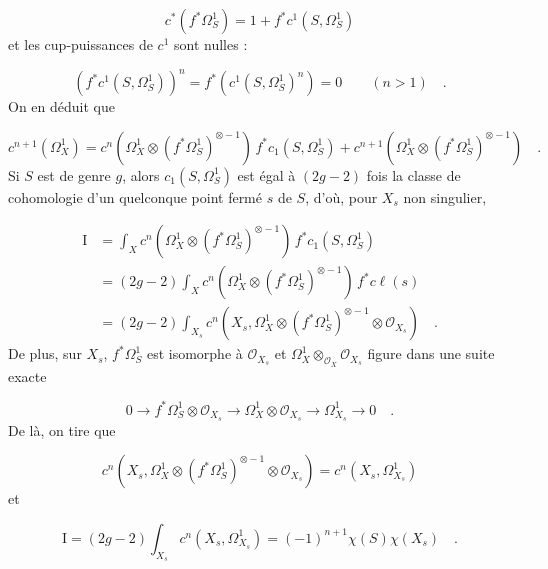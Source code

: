 
\begin{equation*}
c^*(f^*\Omega_S^1)=1+f^*c^1(S,\Omega_S^1)
\end{equation*}
et les cup-puissances de $c^1$ sont nulles :

\begin{equation*}
(f^*c^1(S,\Omega_S^1))^n=f^*(c^1(S,\Omega_S^1)^n)=0 \qquad (n>1) \quad .
\end{equation*}
On en déduit que

\begin{equation*}
c^{n+1}(\Omega_X^1)=c^n\left(\Omega_X^1\otimes(f^*\Omega_S^1)^{\otimes-1}\right)\, f^*c_1(S,\Omega_S^1)+c^{n+1}\left(\Omega_X^1\otimes(f^*\Omega_S^1)^{\otimes-1}\right) \quad .
\end{equation*}
Si $S$ est de genre $g$, alors $c_1(S,\Omega_S^1)$ est égal à $(2g-2)$ fois la classe de cohomologie d'un quelconque point fermé $s$ de $S$, d'où, pour $X_s$ non singulier,

\begin{equation*}
\begin{aligned}
\mathrm{I}
&=\int_X c^n\left(\Omega_X^1\otimes(f^*\Omega_S^1)^{\otimes-1}\right)\, f^*c_1(S,\Omega_S^1) \\
&=(2g-2)\int_X c^n\left(\Omega_X^1\otimes(f^*\Omega_S^1)^{\otimes-1}\right)\, f^*c\ell(s) \\
&=(2g-2)\int_{X_s}c^n\left(X_s,\Omega_X^1\otimes(f^*\Omega_S^1)^{\otimes-1}\otimes\mathcal{O}_{X_s}\right) \quad .
\end{aligned}
\end{equation*}
De plus, sur $X_s$, $f^*\Omega_S^1$ est isomorphe à $\mathcal{O}_{X_s}$ et $\Omega_X^1\otimes_{\mathcal{O}_X}\mathcal{O}_{X_s}$ figure dans une suite exacte

\begin{equation*}
0\longrightarrow f^*\Omega_S^1\otimes\mathcal{O}_{X_s}\longrightarrow\Omega_X^1\otimes\mathcal{O}_{X_s}\longrightarrow\Omega_{X_s}^1\longrightarrow0 \quad .
\end{equation*}
De là, on tire que

\begin{equation*}
c^n\left(X_s,\Omega_X^1\otimes(f^*\Omega_S^1)^{\otimes-1}\otimes\mathcal{O}_{X_s}\right)=c^n(X_s,\Omega_{X_s}^1)
\end{equation*}
et

\begin{equation*}
\mathrm{I}=(2g-2)\int_{X_s}c^n(X_s,\Omega_{X_s}^1)=(-1)^{n+1}\chi(S)\chi(X_s) \quad .
\end{equation*}


